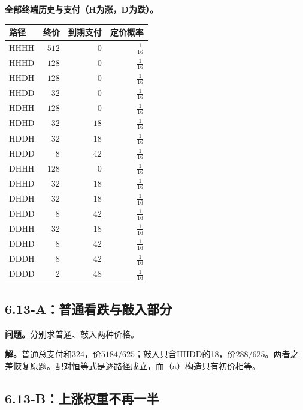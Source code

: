 \documentclass[11pt,a4paper,UTF8,fontset=fandol]{ctexart}
\begin{document}
\textbf{全部终端历史与支付（H为涨，D为跌）。}

\begin{longtable}[]{@{}lrrr@{}}
\toprule\noalign{}
路径 & 终价 & 到期支付 & 定价概率 \\
\midrule\noalign{}
\endhead
\bottomrule\noalign{}
\endlastfoot
HHHH & \(512\) & \(0\) & \(\frac{1}{16}\) \\
HHHD & \(128\) & \(0\) & \(\frac{1}{16}\) \\
HHDH & \(128\) & \(0\) & \(\frac{1}{16}\) \\
HHDD & \(32\) & \(0\) & \(\frac{1}{16}\) \\
HDHH & \(128\) & \(0\) & \(\frac{1}{16}\) \\
HDHD & \(32\) & \(18\) & \(\frac{1}{16}\) \\
HDDH & \(32\) & \(18\) & \(\frac{1}{16}\) \\
HDDD & \(8\) & \(42\) & \(\frac{1}{16}\) \\
DHHH & \(128\) & \(0\) & \(\frac{1}{16}\) \\
DHHD & \(32\) & \(18\) & \(\frac{1}{16}\) \\
DHDH & \(32\) & \(18\) & \(\frac{1}{16}\) \\
DHDD & \(8\) & \(42\) & \(\frac{1}{16}\) \\
DDHH & \(32\) & \(18\) & \(\frac{1}{16}\) \\
DDHD & \(8\) & \(42\) & \(\frac{1}{16}\) \\
DDDH & \(8\) & \(42\) & \(\frac{1}{16}\) \\
DDDD & \(2\) & \(48\) & \(\frac{1}{16}\) \\
\end{longtable}

\endgroup

\subsection{6.13-A：普通看跌与敲入部分}\label{aux666eux901aux770bux8dccux4e0eux6572ux5165ux90e8ux5206}

\textbf{问题。}分别求普通、敲入两种价格。

\textbf{解。}普通总支付和324，价\(\boxed{5184/625}\)；敲入只含HHDD的18，价\(\boxed{288/625}\)。两者之差恢复原题。配对恒等式是逐路径成立，而（a）构造只有初价相等。

\subsection{6.13-B：上涨权重不再一半}\label{bux4e0aux6da8ux6743ux91cdux4e0dux518dux4e00ux534a}
\end{document}
